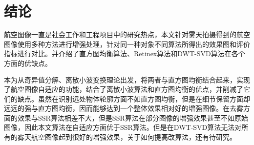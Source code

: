 \chapter{结论}\label{chap:zongJie}航空图像一直是社会工作和工程项目中的研究热点，本文针对雾天拍摄得到的航空图像使用多种方法进行增强处理，针对同一种对象不同算法所得出的效果图和评价指标进行对比。并介绍了直方图均衡算法、Retinex算法和DWT-SVD算法在各个方面的优缺点。

本为从奇异值分解、离散小波变换理论出发，将两者与直方图均衡结合起来，实现了航空图像自适应的功能，结合了离散小波算法和直方图均衡的优点，并削减了它们的缺点。虽然在识别远处物体轮廓方面不如直方图均衡，但是在细节保留方面却远远的强与直方图均衡，因而能够达到一个整体效果相对好的增强图像。在去雾方面的效果与SSR算法相差不大，但是SSR算法在部分图像的增强效果甚至不如原始图像，因此本文算法在自适应方面优于SSR算法。但是在DWT-SVD算法无法对所有的雾天航空图像起到很好的增强效果，关于如何提高改算法，还有待研究。
		